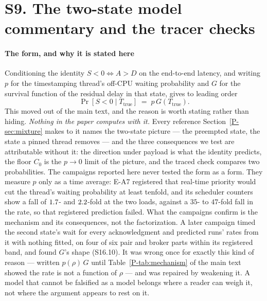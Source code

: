 \documentclass[10pt,journal,onecolumn]{IEEEtran}
\newcommand{\mainRareState}{\ref{P-sec:mixture}}       %
\begin{document}
\section{S9. The two-state model commentary and the tracer checks}
\label{sec:twostatesupp}

\paragraph{The form, and why it is stated here}
Conditioning the identity $S < 0 \iff A > D$ on the end-to-end latency, and writing $p$ for the
timestamping thread's off-CPU waiting probability and $G$ for the survival function of the residual
delay in that state, gives to leading order
\begin{equation}
\label{eq:twostate}
\Pr[S < 0 \mid T_{\mathrm{true}}] \;=\; p\, G(T_{\mathrm{true}}).
\end{equation}
This moved out of the main text, and the reason is worth stating rather than
hiding. \emph{Nothing in the paper computes with it.} Every reference Section~\mainRareState{} makes to it names the two-state picture --- the preempted state, the state a pinned thread
removes --- and the three consequences we test are attributable without it: the direction
under payload is what the identity predicts, the floor $C_0$ is the $p \to 0$ limit of the
picture, and the traced check compares two probabilities. The campaigns reported here never
tested the form as a form. They measure $p$ only as a time average: E-A7 registered that
real-time priority would cut the thread's waiting probability at least tenfold, and its scheduler counters
show a fall of $1.7$- and $2.2$-fold at the two loads, against a $35$-
to $47$-fold fall in the rate, so that registered prediction failed. What the campaigns confirm is the mechanism and its
consequences, not the factorization.
A later campaign timed the second state's wait for every acknowledgment and predicted runs'
rates from it with nothing fitted, on four of six pair and broker parts within its registered
band, and found $G$'s shape (S16.10). It was wrong once for exactly this kind of reason --- written $p(\rho)\,G$
until Table~\ref{P-tab:mechanism} of the main text showed the rate is not a function of
$\rho$ --- and was repaired by weakening it. A model that cannot be falsified as a model
belongs where a reader can weigh it, not where the argument appears to rest on it.
\end{document}
